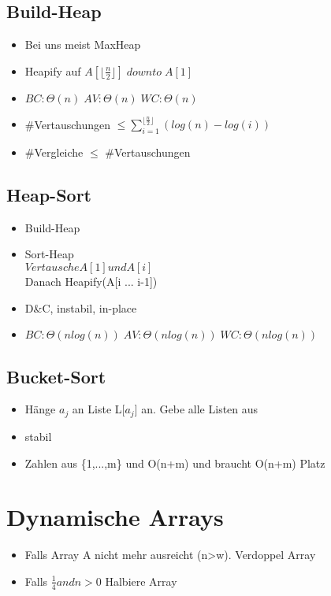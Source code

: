 \documentclass{article}
\begin{document}
\subsection{Build-Heap}
\begin{itemize}
\item Bei uns meist MaxHeap
\item Heapify auf $A[\lfloor \frac{n}{2} \rfloor] \; downto  \;A[1]$
\item $BC: \Theta(n)\; AV:\Theta(n)\; WC: \Theta(n)\;$
\item \#Vertauschungen $\leq \sum_{i=1}^{\lfloor \frac{n}{2} \rfloor} (log(n) -log(i))$
\item \#Vergleiche $\leq$ \#Vertauschungen
\end{itemize}

\subsection{Heap-Sort}
\begin{itemize}
\item Build-Heap
\item Sort-Heap \\
$Vertausche A[1] und A[i]$\\
Danach Heapify(A[i ... i-1])\\
\item D\&C, instabil, in-place 
\item $BC: \Theta(nlog(n))\; AV:\Theta(nlog(n))\; WC: \Theta(nlog(n))\;$
\end{itemize}

\subsection{Bucket-Sort}
\begin{itemize}
\item H{\"a}nge $a_j$ an Liste L[$a_j$] an. Gebe alle Listen aus
\item stabil
\item Zahlen aus \{1,...,m\} und O(n+m) und braucht O(n+m) Platz
\end{itemize}

\section{Dynamische Arrays}
\begin{itemize}
\item Falls Array A nicht mehr ausreicht (n>w). Verdoppel Array 
\item Falls $\frac{1}{4} and n>0$ Halbiere Array
\end{itemize}
\end{document}

